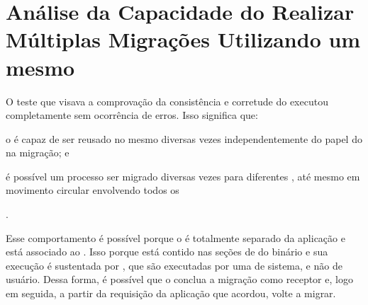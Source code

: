 \section{Análise da Capacidade do \daemon Realizar Múltiplas Migrações Utilizando um mesmo \cluster}

O teste que visava a comprovação da consistência e corretude do \daemon executou completamente sem ocorrência de erros. Isso significa que:
\begin{inlinelist}
    \item o \daemon é capaz de ser reusado no mesmo \cluster diversas vezes independentemente do papel do \cluster na migração; e
    \item é possível um processo ser migrado diversas vezes para diferentes \clusters, até mesmo em movimento circular envolvendo todos os \clusters
\end{inlinelist}.

Esse comportamento é possível porque o \daemon é totalmente separado da aplicação e está associado ao . Isso porque está contido nas seções de  do binário e sua execução é sustentada por \tasks, que são executadas por uma \thread de sistema, e não de usuário. Dessa forma, é possível que o \daemon conclua a migração como receptor e, logo em seguida, a partir da requisição da aplicação que acordou, volte a migrar.